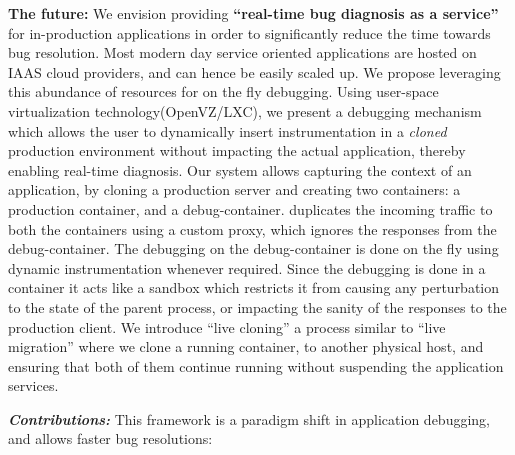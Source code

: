 \textbf{The future: } We envision providing \textbf{``real-time bug diagnosis as a service''} for in-production applications in order to significantly reduce the time towards bug resolution.
Most modern day service oriented applications are hosted on IAAS cloud providers, and can hence be easily scaled  up. 
We propose leveraging this abundance of resources for on the fly debugging.
Using user-space virtualization technology(OpenVZ/LXC\cite{openvz,lxc}), we present a debugging mechanism which allows the user to dynamically insert instrumentation in a \emph{cloned} production environment without impacting the actual application, thereby enabling real-time diagnosis.
Our system \parikshan allows capturing the context of an application, by cloning a production server and creating two containers: a production container, and a debug-container. 
\parikshan duplicates the incoming traffic to both the containers using a custom proxy, which ignores the responses from the debug-container. 
The debugging on the debug-container is done on the fly using dynamic instrumentation whenever required. 
Since the debugging is done in a container it acts like a sandbox which restricts it from causing any perturbation to the state of the parent process, or impacting the sanity of the responses to the production client.
We introduce ``live cloning'' a process similar to ``live migration'' \cite{vmperformance} where we clone a running container, to another physical host, and ensuring that both of them continue running without suspending the application services.

\textit{\textbf{Contributions:}} This framework is a paradigm shift in application debugging, and allows faster bug resolutions:


